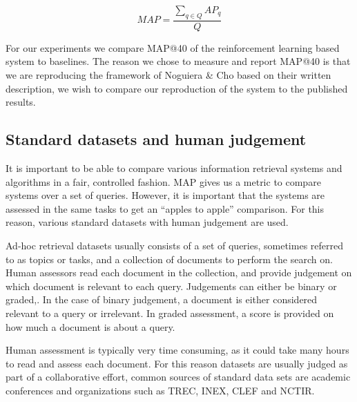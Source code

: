 \begin{equation}
	MAP =  \frac{\sum_{q \in Q} AP_q}{Q}
\end{equation}

For our experiments we compare MAP@40 of the reinforcement learning based system to baselines. The reason we chose to measure and report MAP@40 is that we are reproducing the framework of Noguiera \& Cho \cite{nogueira2017task} based on their written description, we wish to compare our reproduction of the system to the published results. 


%
%
%
%
%
%
%
%
%
%


\subsection{Standard datasets and human judgement}

It is important to be able to compare various information retrieval systems and algorithms in a fair, controlled fashion. MAP gives us a metric to compare systems over a set of queries. However, it is important that the systems are assessed in the same tasks to get an ``apples to apple'' comparison. For this reason, various standard datasets with human judgement are used. 

Ad-hoc retrieval datasets usually consists of a set of queries, sometimes referred to as topics or tasks, and a collection of documents to perform the search on. Human assessors read each document in the collection, and  provide judgement on which document is relevant to each query. Judgements can either be binary or graded,. In the case of binary judgement, a document is either considered relevant to a query or irrelevant.  In graded assessment, a score is provided on how much a document is about a query.  

Human assessment is typically very time consuming, as it could take many hours  to read and assess each document. For this reason datasets are usually judged as part of a collaborative effort, common sources of standard data sets are academic conferences and organizations such as TREC, INEX, CLEF and NCTIR.


